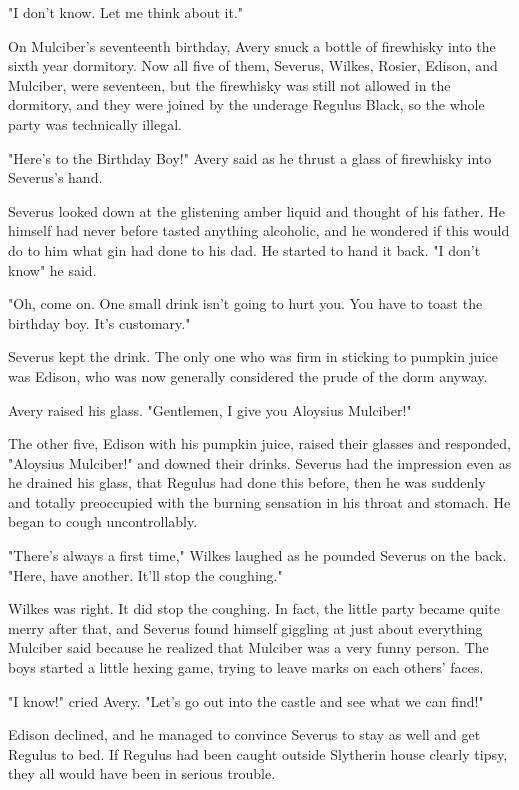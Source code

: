 "I don't know. Let me think about it."

On Mulciber's seventeenth birthday, Avery snuck a bottle of firewhisky into the sixth year dormitory. Now all five of them, Severus, Wilkes, Rosier, Edison, and Mulciber, were seventeen, but the firewhisky was still not allowed in the dormitory, and they were joined by the underage Regulus Black, so the whole party was technically illegal.

"Here's to the Birthday Boy!" Avery said as he thrust a glass of firewhisky into Severus's hand.

Severus looked down at the glistening amber liquid and thought of his father. He himself had never before tasted anything alcoholic, and he wondered if this would do to him what gin had done to his dad. He started to hand it back. "I don't know{\el}" he said.

"Oh, come on. One small drink isn't going to hurt you. You have to toast the birthday boy. It's customary."

Severus kept the drink. The only one who was firm in sticking to pumpkin juice was Edison, who was now generally considered the prude of the dorm anyway.

Avery raised his glass. "Gentlemen, I give you Aloysius Mulciber!"

The other five, Edison with his pumpkin juice, raised their glasses and responded, "Aloysius Mulciber!" and downed their drinks. Severus had the impression even as he drained his glass, that Regulus had done this before, then he was suddenly and totally preoccupied with the burning sensation in his throat and stomach. He began to cough uncontrollably.

"There's always a first time," Wilkes laughed as he pounded Severus on the back. "Here, have another. It'll stop the coughing."

Wilkes was right. It did stop the coughing. In fact, the little party became quite merry after that, and Severus found himself giggling at just about everything Mulciber said because he realized that Mulciber was a very funny person. The boys started a little hexing game, trying to leave marks on each others' faces.

"I know!" cried Avery. "Let's go out into the castle and see what we can find!"

Edison declined, and he managed to convince Severus to stay as well and get Regulus to bed. If Regulus had been caught outside Slytherin house clearly tipsy, they all would have been in serious trouble.

